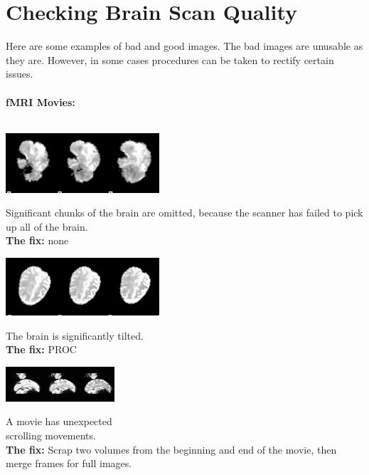 \documentclass{article}
\begin{document}
\section{Checking Brain Scan Quality}
Here are some examples of bad and good images. The bad images are unusable as they are. However, in some cases procedures can be taken to rectify certain issues. \\\\
\textbf{fMRI Movies:}
\\\\
\noindent\begin{minipage}{0.45\textwidth}
	\includegraphics[scale=0.79]{bad_image2.png}
\end{minipage}%
\hfill%
\begin{minipage}{0.45\textwidth}
	Significant chunks of the brain are omitted, because the scanner has failed to pick up all of the brain.\\
	\textbf{The fix:} none
\end{minipage}\newline\newline
\noindent\begin{minipage}{0.45\textwidth}
	\includegraphics[scale=0.79]{bad_image3.png}
\end{minipage}%
\hfill%
\begin{minipage}{0.45\textwidth}
	The brain is significantly tilted. \\
	\textbf{The fix:} PROC
\end{minipage}
\noindent\begin{minipage}{0.45\textwidth}
	\includegraphics[scale=1.115]{bad_image5.png}
\end{minipage}%
\hfill%
\begin{minipage}{0.45\textwidth}
	A movie has unexpected \\scrolling movements. \\
	\textbf{The fix:} Scrap two volumes from the beginning and end of the movie, then merge frames for full images.
\end{minipage}\\\\\\
\end{document}

